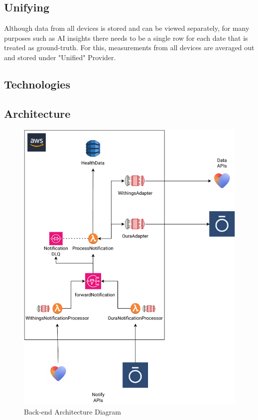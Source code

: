 \subsection{Unifying}
Although data from all devices is stored and can be viewed separately, for many purposes such as AI insights there needs to be a single row for each date that is treated as ground-truth. For this, measurements from all devices are averaged out and stored under "Unified" Provider. 
\subsection{Technologies}

\subsection{Architecture}
\begin{figure}
    
    \centering
    \includegraphics[width=\textwidth,height=\textheight,keepaspectratio]{../images/backend.pdf}
    \caption{Back-end Architecture Diagram}
    \label{fig:backend}
    
\end{figure}
